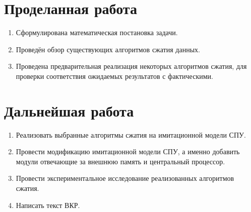 \documentclass[a4peper, 12pt, titlepage, finall]{extreport}
\begin{document}
    \section{Проделанная работа}
        \begin{enumerate}
            \item Сформулирована математическая постановка задачи.
            \item Проведён обзор существующих алгоритмов сжатия данных.
            \item Проведена предварительная реализация некоторых алгоритмов сжатия, для проверки соответствия ожидаемых результатов с фактическими.
        \end{enumerate}
    \section{Дальнейшая работа}
        \begin{enumerate}
            \item Реализовать выбранные алгоритмы сжатия на имитационной модели СПУ.
            \item Провести модификацию имитационной модели СПУ, а именно добавить модули отвечающие за внешнюю память и центральный процессор.
            \item Провести экспериментальное исследование реализованных алгоритмов сжатия.
            \item Написать текст ВКР.
        \end{enumerate}
    \begingroup
    \let\clearpage\relax
    \printbibliography
    \endgroup
\end{document}
